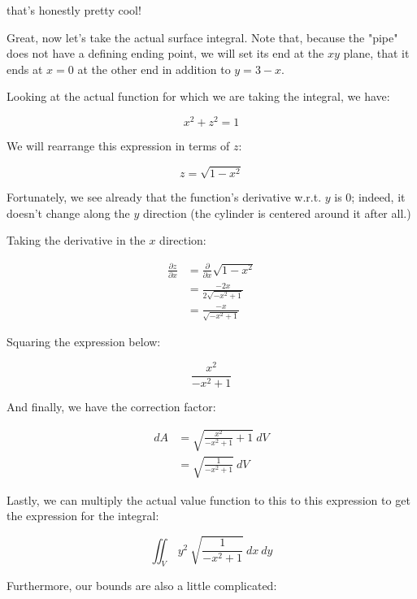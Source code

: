 \documentclass[letterpaper]{article}
\begin{document}
that's honestly pretty cool!

Great, now let's take the actual surface integral. Note that, because the "pipe" does not have a defining ending point, we will set its end at the \(xy\) plane, that it ends at \(x=0\) at the other end in addition to \(y=3-x\).

Looking at the actual function for which we are taking the integral, we have:

\begin{equation}
   x^2 + z^2 = 1 
\end{equation}

We will rearrange this expression in terms of \(z\):

\begin{equation}
   z = \sqrt{1-x^2}
\end{equation}

Fortunately, we see already that the function's derivative w.r.t. \(y\) is \(0\); indeed, it doesn't change along the \(y\) direction (the cylinder is centered around it after all.)

Taking the derivative in the \(x\) direction:

\begin{align}
   \frac{\partial z}{\partial x} &= \frac{\partial}{\partial x} \sqrt{1-x^2} \\
&= \frac{-2x}{2\sqrt{-x^2+1}}\\
&= \frac{-x}{\sqrt{-x^2+1}}
\end{align}

Squaring the expression below:

\begin{equation}
\frac{x^2}{-x^2+1}
\end{equation}

And finally, we have the correction factor:

\begin{align}
    dA &= \sqrt{\frac{x^2}{-x^2+1} + 1}\ dV\\
&= \sqrt{\frac{1}{-x^2+1}}\ dV
\end{align}

Lastly, we can multiply the actual value function to this to this expression to get the expression for the integral:

\begin{equation}
   \iint_V\ y^2\ \sqrt{\frac{1}{-x^2+1}}\ dx\ dy
\end{equation}

Furthermore, our bounds are also a little complicated:
\end{document}
